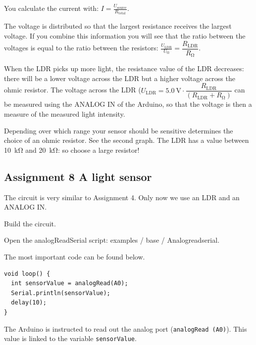 \documentclass{arduino}
\begin{document}
You calculate the current with: $ I = \frac{U_\mathrm{source}}{R_\mathrm{total}} $. 

The voltage is distributed so that the largest resistance receives the largest voltage. If you combine this information you will see that the ratio between the voltages is equal to the ratio between the resistors: $ \frac{U_\mathrm{LDR}}{U _ {\si{\ohm}}} = \dfrac{R_\mathrm{LDR}}{R_{\si{\ohm}}} $.


When the LDR picks up more light, the resistance value of the LDR decreases: there will be a lower voltage across the LDR but a higher voltage across the ohmic resistor. The voltage across the LDR ($ U_\mathrm{LDR} = \SI{5.0}{\volt} \cdot \dfrac{R_\mathrm{LDR}}{(R_\mathrm{LDR} + R_{\si{\ohm}})} $ can be measured using the ANALOG IN of the Arduino, so that the voltage is then a measure of the measured light intensity.

Depending over which range your sensor should be sensitive determines the choice of an ohmic resistor. See the second graph. The LDR has a value between \SI{10}{\kilo\ohm} and \SI{20}{\kilo\ohm}: so choose a large resistor!

\newpage

\subsection{Assignment 8 A light sensor}


The circuit is very similar to Assignment 4. Only now we use an LDR and an ANALOG IN.

\begin{alphalist}
\item Build the circuit.

\item Open the analogReadSerial  script: examples / base / Analogreadserial.
\end{alphalist}

The most important code can be found below.

\begin{lstlisting}
void loop() {
  int sensorValue = analogRead(A0);
  Serial.println(sensorValue);
  delay(10);
}
\end{lstlisting}

The Arduino is instructed to read out the analog port (\lstinline{analogRead (A0)}). This value is linked to the variable \lstinline{sensorValue}. 
\end{document}
